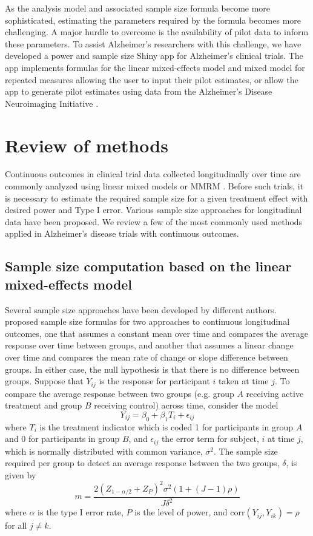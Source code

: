 As the analysis model and associated sample size formula become more sophisticated, estimating the parameters required by the formula becomes more challenging. A major hurdle to overcome is the availability of pilot data to inform these parameters. To assist Alzheimer's researchers with this challenge, we have developed a power and sample size Shiny app for Alzheimer's clinical trials. The app implements formulas for the linear mixed-effects model and mixed model for repeated measures \citep[MMRM; ][]{Lu_Luo_Chen(2008)} allowing the user to input their pilot estimates, or allow the app to generate pilot estimates using data from the Alzheimer's Disease Neuroimaging Initiative \citep[ADNI; ][]{Weiner_etal(2015)}.

\section{Review of methods}
\label{sec2}
Continuous outcomes in clinical trial data collected longitudinally over time are commonly analyzed using linear mixed models \citep[LMM; ][]{Laird_Ware(1982)} or MMRM \citep{Mallinckrodt_etal(2001),Mallinckrodt_etal(2003)}. Before such trials, it is necessary to estimate the required sample size for a given treatment effect with desired power and Type I error. Various sample size approaches for longitudinal data have been proposed. We review a few of the most commonly used methods applied in Alzheimer’s disease trials with continuous outcomes.


\subsection{Sample size computation based on the linear mixed-effects model}
\label{model}
Several sample size approaches have been developed by different authors. \cite{Diggle_etal(2002)} proposed sample size formulas for two approaches to continuous longitudinal outcomes, one that assumes a constant mean over time and compares the average response over time between groups, and another that assumes a linear change over time and compares the mean rate of change or slope difference between groups. In either case, the null hypothesis is that there is no difference between groups. Suppose that $Y_{ij}$ is the response for participant $i$ taken at time $j$. To compare the average response between two groups (e.g. group $A$ receiving active treatment and group $B$ receiving control) across time, consider the model
$$Y_{ij}=\beta_0+\beta_1T_i+\epsilon_{ij}$$
where $T_i$ is the treatment indicator which is coded 1 for participants in group $A$ and 0 for participants in group $B$, and $\epsilon_{ij}$ the error term for subject, $i$ at time $j$, which is normally distributed with common variance, $\sigma^2$. The sample size required per group to detect an average response between the two groups, $\delta$, is given by
$$m=\frac{2(Z_{1-\alpha/2}+Z_{P})^2\sigma^2(1+(J-1)\rho)}{J\delta^2}$$
where $\alpha$ is the type I error rate, $P$ is the level of power, and $\mbox{corr}(Y_{ij},Y_{ik})=\rho$ for all $j\neq k$.

